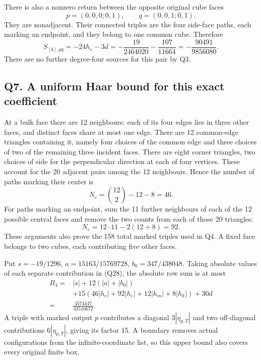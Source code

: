 \documentclass[11pt]{article}
\begin{document}
There is also a nonzero return between the opposite original cube faces
\[
 p=(0,0,0;0,1),\qquad q=(0,0,1;0,1).
\]
They are nonadjacent. Their connected triples are the four side-face paths, each marking an endpoint, and they belong to one common cube. Therefore
\[
 S_{[4],pq}
 =-24h_e-3d
 =-\frac{19}{2464020}-\frac{107}{11664}
 =-\frac{90491}{9856080}.
 \tag{Q32}
\]
There are no further degree-four sources for this pair by Q3.

\subsection*{Q7. A uniform Haar bound for this exact coefficient}

At a bulk face there are 12 neighbours: each of its four edges lies in three other faces, and distinct faces share at most one edge. There are 12 common-edge triangles containing it, namely four choices of the common edge and three choices of two of the remaining three incident faces. There are eight corner triangles, two choices of side for the perpendicular direction at each of four vertices. These account for the 20 adjacent pairs among the 12 neighbours. Hence the number of paths marking their center is
\[
 N_c=\binom{12}{2}-12-8=46.
\]
For paths marking an endpoint, sum the 11 further neighbours of each of the 12 possible central faces and remove the two counts from each of those 20 triangles:
\[
 N_e=12\cdot11-2(12+8)=92.
 \tag{Q33}
\]
These arguments also prove the 158 total marked triples used in Q4. A fixed face belongs to two cubes, each contributing five other faces.

Put \(s=-19/1296\), \(a=15163/15769728\), \(b_0=347/438048\). Taking absolute values of each separate contribution in (Q28), the absolute row sum is at most
\[
 \begin{aligned}
 B_4={}&|s|+12(|a|+|b_0|)\\
 &+15\left(46|h_c|+92|h_e|+12|h_m|+8|h_k|\right)+30d\\
 ={}&\frac{4574447}{33510672}.
 \end{aligned}\tag{Q34}
\]
A triple with marked output \(p\) contributes a diagonal \(3|\eta_{p,T}|\) and two off-diagonal contributions \(6|\eta_{p,T}|\), giving its factor 15. A boundary removes actual configurations from the infinite-coordinate list, so this upper bound also covers every original finite box.
\end{document}
